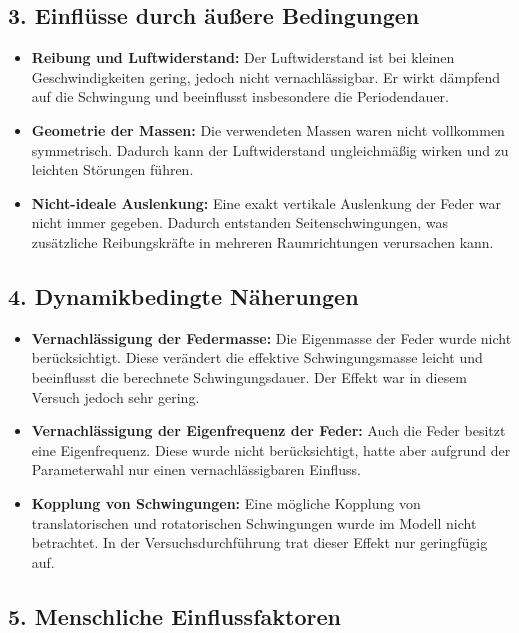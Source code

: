 \subsection*{3. Einflüsse durch äußere Bedingungen}

\begin{itemize}
    \item \textbf{Reibung und Luftwiderstand:} Der Luftwiderstand ist bei kleinen Geschwindigkeiten gering, jedoch nicht vernachlässigbar. Er wirkt dämpfend auf die Schwingung und beeinflusst insbesondere die Periodendauer.
    
    \item \textbf{Geometrie der Massen:} Die verwendeten Massen waren nicht vollkommen symmetrisch. Dadurch kann der Luftwiderstand ungleichmäßig wirken und zu leichten Störungen führen.
    
    \item \textbf{Nicht-ideale Auslenkung:} Eine exakt vertikale Auslenkung der Feder war nicht immer gegeben. Dadurch entstanden Seitenschwingungen, was zusätzliche Reibungskräfte in mehreren Raumrichtungen verursachen kann.
\end{itemize}

\subsection*{4. Dynamikbedingte Näherungen}

\begin{itemize}
    \item \textbf{Vernachlässigung der Federmasse:} Die Eigenmasse der Feder wurde nicht berücksichtigt. Diese verändert die effektive Schwingungsmasse leicht und beeinflusst die berechnete Schwingungsdauer. Der Effekt war in diesem Versuch jedoch sehr gering.
    
    \item \textbf{Vernachlässigung der Eigenfrequenz der Feder:} Auch die Feder besitzt eine Eigenfrequenz. Diese wurde nicht berücksichtigt, hatte aber aufgrund der Parameterwahl nur einen vernachlässigbaren Einfluss.
    
    \item \textbf{Kopplung von Schwingungen:} Eine mögliche Kopplung von translatorischen und rotatorischen Schwingungen wurde im Modell nicht betrachtet. In der Versuchsdurchführung trat dieser Effekt nur geringfügig auf.
\end{itemize}

\subsection*{5. Menschliche Einflussfaktoren}

